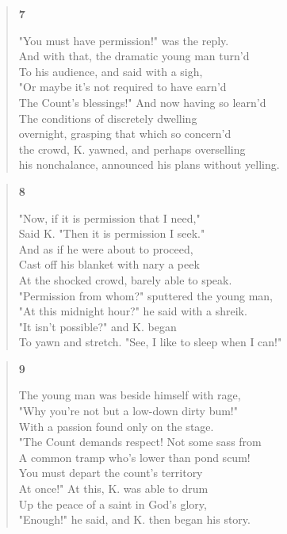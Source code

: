 \documentclass{article}
\begin{document}
\begin{verse}
  \begin{center}
    \textbf{7} \\
  \end{center}
  "You must have permission!" was the reply. \\
  And with that, the dramatic young man turn'd \\
  To his audience, and said with a sigh, \\
  "Or maybe it's not required to have earn'd \\
  The Count's blessings!" And now having so learn'd \\
  The conditions of discretely dwelling \\
  overnight, grasping that which so concern'd \\
  the crowd, K. yawned, and perhaps overselling \\
  his nonchalance, announced his plans without yelling.
\end{verse}
\newpage
\begin{verse}
  \begin{center}
    \textbf{8} \\
  \end{center}
  "Now, if it is permission that I need," \\
  Said K. "Then it is permission I seek." \\
  And as if he were about to proceed, \\
  Cast off his blanket with nary a peek \\
  At the shocked crowd, barely able to speak. \\
  "Permission from whom?" sputtered the young man, \\
  "At this midnight hour?" he said with a shreik. \\
  "It isn't possible?" and K. began \\
  To yawn and stretch. "See, I like to sleep when I can!"
\end{verse}
\begin{verse}
  \begin{center}
    \textbf{9} \\
  \end{center}
  The young man was beside himself with rage, \\
  "Why you're not but a low-down dirty bum!" \\
  With a passion found only on the stage. \\
  "The Count demands respect! Not some sass from \\
  A common tramp who's lower than pond scum! \\
  You must depart the count's territory \\
  At once!" At this, K. was able to drum \\
  Up the peace of a saint in God's glory, \\
  "Enough!" he said, and K. then began his story.
\end{verse}
\end{document}

